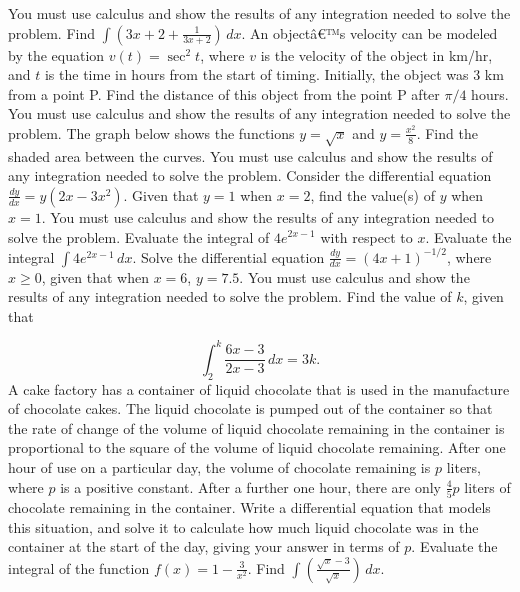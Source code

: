 \documentclass[12pt,addpoints]{exam}
\begin{document}
\begin{questions}
You must use calculus and show the results of any integration needed to solve the problem.
\fillwithlines{5cm}
\question[5] Find \(\int \left( 3x + 2 + \frac{1}{3x + 2} \right) \, dx\).
\fillwithlines{5cm}
\question[5] An objectâ€™s velocity can be modeled by the equation \(v(t) = \sec^2 t\), where \(v\) is the velocity of the object in km/hr, and \(t\) is the time in hours from the start of timing. Initially, the object was 3 km from a point P. Find the distance of this object from the point P after \(\pi/4\) hours. You must use calculus and show the results of any integration needed to solve the problem.
\fillwithlines{5cm}
\question[5] The graph below shows the functions \( y = \sqrt{x} \) and \( y = \frac{x^2}{8} \). Find the shaded area between the curves. You must use calculus and show the results of any integration needed to solve the problem.
\fillwithlines{5cm}
\question[5] Consider the differential equation \( \frac{dy}{dx} = y(2x - 3x^2) \). Given that \( y = 1 \) when \( x = 2 \), find the value(s) of \( y \) when \( x = 1 \). You must use calculus and show the results of any integration needed to solve the problem.
\fillwithlines{5cm}
\question[5] Evaluate the integral of \(4e^{2x-1}\) with respect to \(x\).
\fillwithlines{5cm}
\question[5] Evaluate the integral \(\int 4e^{2x-1} \, dx\).
\fillwithlines{5cm}
\question[5] Solve the differential equation \(\frac{dy}{dx} = (4x+1)^{-1/2}\), where \(x \geq 0\), given that when \(x = 6\), \(y = 7.5\). You must use calculus and show the results of any integration needed to solve the problem.
\fillwithlines{5cm}
\question[5] Find the value of \( k \), given that

\[
\int_{2}^{k} \frac{6x - 3}{2x - 3} \, dx = 3k.
\]
\fillwithlines{5cm}
\question[5] A cake factory has a container of liquid chocolate that is used in the manufacture of chocolate cakes. The liquid chocolate is pumped out of the container so that the rate of change of the volume of liquid chocolate remaining in the container is proportional to the square of the volume of liquid chocolate remaining. After one hour of use on a particular day, the volume of chocolate remaining is \( p \) liters, where \( p \) is a positive constant. After a further one hour, there are only \( \frac{4}{5} p \) liters of chocolate remaining in the container. Write a differential equation that models this situation, and solve it to calculate how much liquid chocolate was in the container at the start of the day, giving your answer in terms of \( p \).
\fillwithlines{5cm}
\question[5] Evaluate the integral of the function \( f(x) = 1 - \frac{3}{x^2} \).
\fillwithlines{5cm}
\question[5] Find \(\int \left( \frac{\sqrt{x} - 3}{\sqrt{x}} \right) \, dx\).
\fillwithlines{5cm}

\end{questions}
\end{document}
